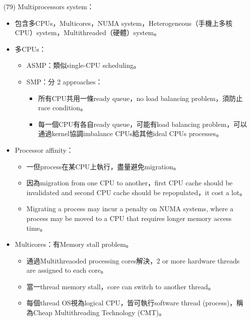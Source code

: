 \begin{theorem}{(79)} Multiprocessors system：\begin{itemize}
        \item 包含多CPUs，Multicores，NUMA system，Heterogeneous（手機上多核CPU）system，Multithreaded（硬體）system。
        \item 多CPUs：\begin{itemize}
            \item ASMP：類似single-CPU scheduling。
            \item SMP：分 2 approaches：\begin{itemize}
                \item 所有CPU共用一條ready queue，no load balancing problem，須防止race condition。
                \item 每一個CPU有各自ready queue，可能有load balancing problem，可以通過kernel協調imbalance CPUs給其他ideal CPUs processes。
            \end{itemize}
        \end{itemize}
        \item Processor affinity：\begin{itemize}
            \item 一但process在某CPU上執行，盡量避免migration。
            \item 因為migration from one CPU to another，first CPU cache should be invalidated and second CPU cache should be repopulated，it cost a lot。
            \item Migrating a process may incur a penalty on NUMA systems, where a process may be moved to a CPU that requires longer memory access time。
        \end{itemize}
        \item Multicores：有Memory stall problem。\begin{itemize}
            \item 通過Multithreaoded processing cores解決，2 or more hardware threads are assigned to each core。
            \item 當一thread memory stall，core can switch to another thread。
            \item 每個thread OS視為logical CPU，皆可執行software thread (process)，稱為Cheap Multithreading Technology (CMT)。
        \end{itemize}
    \end{itemize}
\end{theorem}

